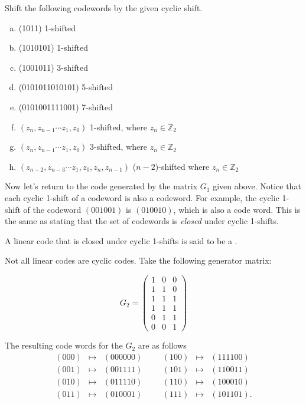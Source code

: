 \begin{exercise}
Shift the following codewords by the given cyclic shift.
\begin{enumerate}[(a)]
\item (1011)  1-shifted
\item (1010101)  1-shifted
\item (1001011)  3-shifted
\item (0101011010101) 5-shifted
\item (0101001111001)  7-shifted
\item $(z_n, z_{n-1} \cdots z_1,z_0)$  1-shifted, where $z_n \in \mathbb{Z}_2$
\item $(z_n, z_{n-1} \cdots z_1,z_0)$  3-shifted, where $z_n \in \mathbb{Z}_2$
\item $(z_{n-2}, z_{n-3} \cdots z_1, z_0, z_{n},z_{n-1})$ ($n-2$)-shifted where $z_n \in \mathbb{Z}_2$
\end{enumerate}
\end{exercise}

Now let's return to the code generated by the matrix $G_1$ given above. Notice that each cyclic 1-shift of a codeword is also a codeword.  For example, the cyclic 1-shift of the codeword $(001001)$ is $(010010)$, which is also a code word.  This is the same as stating that the set of codewords is \emph{closed} under cyclic 1-shifts.  

\begin{defn}\label{def:cycliccode}
A linear code that is closed under cyclic 1-shifts is said to be a .  
\end{defn}

Not all linear codes are cyclic codes.  Take the following generator matrix: 

\[
G_2 = 
\begin{pmatrix}
1 & 0 & 0 \\
1 & 1 & 0 \\
1 & 1 & 1 \\
1 & 1 & 1 \\
0 & 1 & 1 \\
0 & 0 & 1
\end{pmatrix}
\]

The resulting code words for the $G_2$ are as follows\[
\begin{array}{rclccrcl}
(000) & \mapsto & (000000) & & & (100) & \mapsto & (111100) \\
(001) & \mapsto & (001111) & & & (101) & \mapsto & (110011) \\
(010) & \mapsto & (011110) & & & (110) & \mapsto & (100010) \\
(011) & \mapsto & (010001) & & & (111) & \mapsto & (101101).
\end{array}
\]

